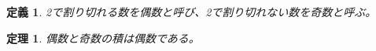 \documentclass{ltjsarticle}
\newtheorem{dfn}{定義} %
\newtheorem{thm}{定理} %
\begin{document}
\begin{dfn}
2で割り切れる数を偶数と呼び、2で割り切れない数を奇数と呼ぶ。
\end{dfn}
\begin{thm}
偶数と奇数の積は偶数である。
\end{thm}
\end{document}
